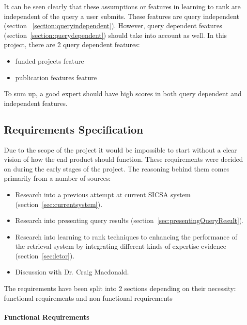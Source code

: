 It can be seen clearly that these assumptions or features in learning to rank are independent of the query a user submits. These features are query independent
(section ~\ref{section:queryindependent}). However, query dependent features (section~\ref{section:querydependent}) should take into account as well. 
In this project, there are 2 query dependent features: 
\begin{itemize}
 \item funded projects feature
 \item publication features feature
\end{itemize}

To sum up, a good expert should have high scores in both query dependent and independent features.

\subsection{Requirements Specification}
Due to the scope of the project it would be impossible to start without a clear vision of how
the end product should function. These requirements were decided on during the early stages of the project. 
The reasoning behind them comes primarily from a number of sources:
\begin{itemize}
 \item Research into a previous attempt at current SICSA system (section~\ref{sec:currentsystem}).
 \item Research into presenting query results (section~\ref{sec:presentingQueryResult}).
 \item Research into learning to rank techniques to enhancing the performance of the retrieval system by integrating different kinds of 
 expertise evidence (section~\ref{sec:letor}).
 \item Discussion with Dr. Craig Macdonald.
\end{itemize}
The requirements have been split into 2 sections depending on their necessity: functional requirements and non-functional requirements

\paragraph{Functional Requirements}
